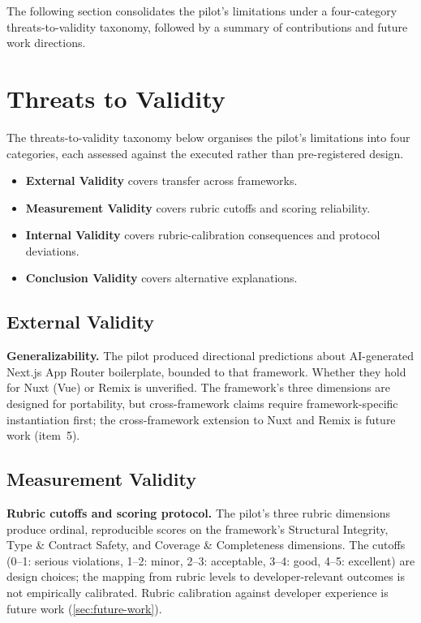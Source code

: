 \documentclass[12pt,a4paper]{report}
\begin{document}
The following section consolidates the pilot's limitations under a four-category threats-to-validity taxonomy, followed by a summary of contributions and future work directions.

\section{Threats to Validity}
\label{sec:threats}

The threats-to-validity taxonomy below organises the pilot's limitations into four categories, each assessed against the executed rather than pre-registered design.
\begin{itemize}
    \item \textbf{External Validity} covers transfer across frameworks.
    \item \textbf{Measurement Validity} covers rubric cutoffs and scoring reliability.
    \item \textbf{Internal Validity} covers rubric-calibration consequences and protocol deviations.
    \item \textbf{Conclusion Validity} covers alternative explanations.
\end{itemize}

\subsection{External Validity}
\label{sec:external-validity}

\textbf{Generalizability.} The pilot produced directional predictions about AI-generated Next.js App Router boilerplate, bounded to that framework. Whether they hold for Nuxt (Vue) or Remix is unverified. The framework's three dimensions are designed for portability, but cross-framework claims require framework-specific instantiation first; the cross-framework extension to Nuxt and Remix is future work (item~5).

\subsection{Measurement Validity}
\label{sec:measurement-validity}

\textbf{Rubric cutoffs and scoring protocol.} The pilot's three rubric dimensions produce ordinal, reproducible scores on the framework's Structural Integrity, Type \& Contract Safety, and Coverage \& Completeness dimensions. The cutoffs (0--1: serious violations, 1--2: minor, 2--3: acceptable, 3--4: good, 4--5: excellent) are design choices; the mapping from rubric levels to developer-relevant outcomes is not empirically calibrated. Rubric calibration against developer experience is future work (\autoref{sec:future-work}).
\end{document}

